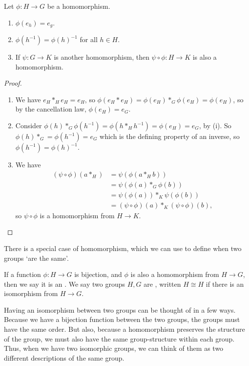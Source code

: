 \documentclass[a4]{scrreprt}
\begin{document}
\begin{proposition}
	Let $\phi : H \rightarrow G$ be a homomorphism.
	\begin{enumerate}[label=(\roman*)]
		\item $\phi(e_h) = e_g$. 
		\item $\phi(h^{-1}) = \phi(h)^{-1}$ for all $h \in H$.
		\item If $\psi : G \rightarrow K$ is another homomorphism, then $\psi \circ \phi : H \rightarrow K$ is also a homomorphism.
	\end{enumerate}
\end{proposition}
\begin{proof}
	$ $ \phantom{\qedhere}
	\begin{enumerate}[label=(\roman*)]
		\item We have $e_H *_H e_H = e_H$, so $\phi(e_H * e_H) = \phi(e_H) *_G \phi(e_H) = \phi(e_H)$, so by the cancellation law, $\phi(e_H) = e_G$.
		\item Consider $\phi(h) *_G \phi(h^{-1}) = \phi(h *_H h^{-1}) = \phi(e_H) = e_G$, by (i). So $\phi(h) *_G = \phi(h^{-1}) = e_G$ which is the defining property of an inverse, so $\phi(h^{-1}) = \phi(h)^{-1}$.
		\item We have 
		\begin{align*}
			(\psi \circ \phi)(a *_H) &= \psi(\phi(a *_H b))\\
									 &= \psi(\phi(a) *_G \phi(b))\\ 
									 &= \psi(\phi(a)) *_K \psi(\phi(b)) \\
									 &= (\psi \circ \phi)(a) *_K (\psi \circ \phi)(b),
		\end{align*}
		so $\psi \circ \phi$ is a homomorphism from $H \rightarrow K$.\hfill \qedsymbol
	\end{enumerate}
\end{proof}


There is a special case of homomorphism, which we can use to define when two groups `are the same'.

\begin{definition}[Isomorphism]
	If a function $\phi : H \rightarrow G$ is bijection, and $\phi$ is also a homomorphism from $H \rightarrow G$, then we say it is an . We say two groups $H, G$ are , written $H \cong H$ if there is an isomorphism from $H \rightarrow G$.
\end{definition}

Having an isomorphism between two groups can be thought of in a few ways. Because we have a bijection function between the two groups, the groups must have the same order. But also, because a homomorphism preserves the structure of the group, we must also have the same group-structure within each group. Thus, when we have two isomorphic groups, we can think of them as two different descriptions of the same group.
\end{document}
